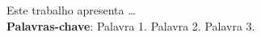 \begin{resumo}[RESUMO]
\begin{SingleSpacing}

Este trabalho apresenta \dots\\

\textbf{Palavras-chave}: Palavra 1. Palavra 2. Palavra 3.

\end{SingleSpacing}
\end{resumo}